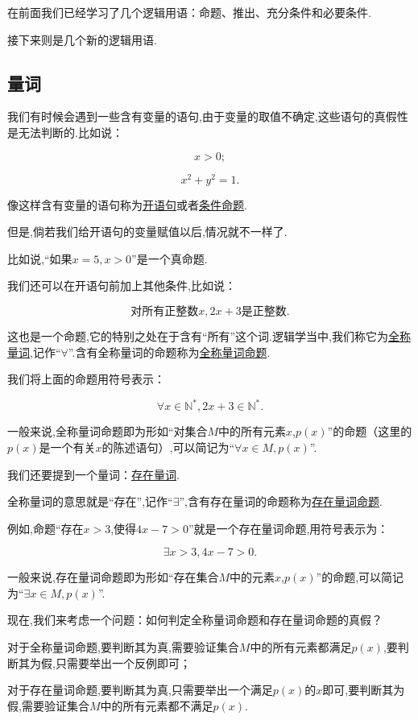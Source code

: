 \documentclass[lang=cn,math=cm,chinesefont=nofont,11pt,scheme=chinese,twocol]{elegantbook}
\begin{document}
在前面我们已经学习了几个逻辑用语：命题、推出、充分条件和必要条件.

接下来则是几个新的逻辑用语.

\subsection{量词}

我们有时候会遇到一些含有变量的语句,由于变量的取值不确定,这些语句的真假性是无法判断的.比如说：

$$x>0;$$

$$x^2+y^2=1.$$

像这样含有变量的语句称为\underline{开语句}或者\underline{条件命题}.

但是,倘若我们给开语句的变量赋值以后,情况就不一样了.

比如说,“如果$x=5,x>0$”是一个真命题.

我们还可以在开语句前加上其他条件,比如说：

$$\text{对所有正整数}x,2x+3\text{是正整数.}$$

这也是一个命题,它的特别之处在于含有“所有”这个词.逻辑学当中,我们称它为\underline{全称量词},记作“$\forall$”.含有全称量词的命题称为\underline{全称量词命题}.

我们将上面的命题用符号表示：

$$\forall x\in\mathbb{N}^*,2x+3\in\mathbb{N}^*.$$

一般来说,全称量词命题即为形如“对集合$M$中的所有元素$x$,$p(x)$”的命题（这里的$p(x)$是一个有关$x$的陈述语句）,可以简记为“$\forall x\in M,p(x)$”.

\hspace*{\fill}

我们还要提到一个量词：\underline{存在量词}.

全称量词的意思就是“存在”,记作“$\exists$”,含有存在量词的命题称为\underline{存在量词命题}.

例如,命题“存在$x>3$,使得$4x-7>0$”就是一个存在量词命题,用符号表示为：

$$\exists x>3,4x-7>0.$$

一般来说,存在量词命题即为形如“存在集合$M$中的元素$x$,$p(x)$”的命题,可以简记为“$\exists x\in M,p(x)$”.

现在,我们来考虑一个问题：如何判定全称量词命题和存在量词命题的真假？

对于全称量词命题,要判断其为真,需要验证集合$M$中的所有元素都满足$p(x)$,要判断其为假,只需要举出一个反例即可；

对于存在量词命题,要判断其为真,只需要举出一个满足$p(x)$的$x$即可,要判断其为假,需要验证集合$M$中的所有元素都不满足$p(x)$.
\end{document}
